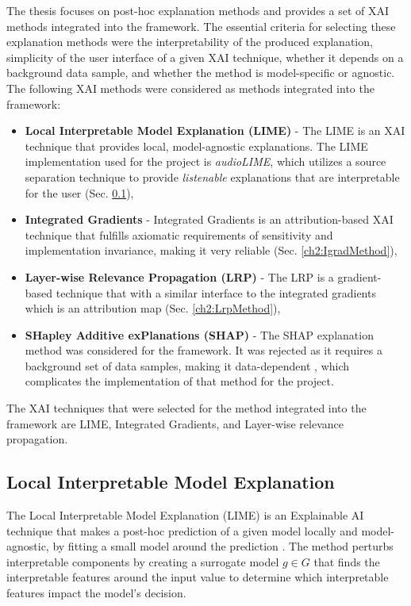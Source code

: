\documentclass[
    bindingoffset=5mm,  %
    footnoteindent=3mm, %
    hyphenation=true    %
]{src/wut-thesis}
\begin{document}
The thesis focuses on post-hoc explanation methods and provides a set of XAI methods integrated
into the framework. The essential criteria for selecting these explanation methods were the
interpretability of the produced explanation, simplicity of the user interface of a given XAI
technique, whether it depends on a background data sample, and whether the method is model-specific
or agnostic. The following XAI methods were considered as methods integrated into the framework:
\begin{itemize}
    \item \textbf{Local Interpretable Model Explanation (LIME)} - The LIME is an XAI technique that
        provides local, model-agnostic explanations. The LIME implementation used for the project
        is \emph{audioLIME}, which utilizes a source separation technique to provide \emph{listenable}
        explanations that are interpretable for the user (Sec. \ref{ch2:LimeMethod}),
    \item \textbf{Integrated Gradients} - Integrated Gradients is an attribution-based XAI technique
        that fulfills axiomatic requirements of sensitivity and implementation invariance, making it
        very reliable \cite{Sundararajan2017-zy} (Sec. \ref{ch2:IgradMethod}),
    \item \textbf{Layer-wise Relevance Propagation (LRP)} - The LRP is a gradient-based technique that
        with a similar interface to the integrated gradients which is an attribution map
        (Sec. \ref{ch2:LrpMethod}),
    \item \textbf{SHapley Additive exPlanations (SHAP)} - The SHAP explanation method \cite{NIPS2017_8a20a862}
        was considered for the framework. It was rejected as it requires a background set of data
        samples, making it data-dependent \cite{Spinner2019-jg}, which complicates the
        implementation of that method for the project.
\end{itemize}

The XAI techniques that were selected for the method integrated into the framework
are LIME, Integrated Gradients, and Layer-wise relevance propagation.

\subsection{Local Interpretable Model Explanation} \label{ch2:LimeMethod} %

The Local Interpretable Model Explanation (LIME) is an Explainable AI technique that
makes a post-hoc prediction of a given model locally and model-agnostic,
by fitting a small model around the prediction \cite{Ribeiro2016-cw}.
The method perturbs interpretable components
by creating a surrogate model $g \in G$ that finds the interpretable features
around the input value to determine which interpretable features impact the model's
decision.
\end{document}
